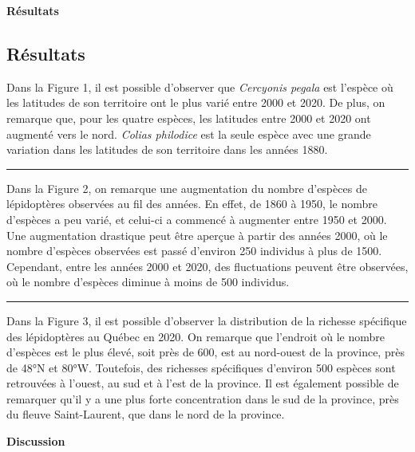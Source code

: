 \documentclass[9pt,twocolumn,twoside,]{pnas-new}
\begin{document}
\textbf{Résultats}

\subsection{Résultats}\label{ruxe9sultats}

Dans la Figure 1, il est possible d'observer que \emph{Cercyonis pegala}
est l'espèce où les latitudes de son territoire ont le plus varié entre
2000 et 2020. De plus, on remarque que, pour les quatre espèces, les
latitudes entre 2000 et 2020 ont augmenté vers le nord. \emph{Colias
philodice} est la seule espèce avec une grande variation dans les
latitudes de son territoire dans les années 1880.

\begin{center}\rule{0.5\linewidth}{0.5pt}\end{center}

Dans la Figure 2, on remarque une augmentation du nombre d'espèces de
lépidoptères observées au fil des années. En effet, de 1860 à 1950, le
nombre d'espèces a peu varié, et celui-ci a commencé à augmenter entre
1950 et 2000. Une augmentation drastique peut être aperçue à partir des
années 2000, où le nombre d'espèces observées est passé d'environ 250
individus à plus de 1500. Cependant, entre les années 2000 et 2020, des
fluctuations peuvent être observées, où le nombre d'espèces diminue à
moins de 500 individus.

\begin{center}\rule{0.5\linewidth}{0.5pt}\end{center}

Dans la Figure 3, il est possible d'observer la distribution de la
richesse spécifique des lépidoptères au Québec en 2020. On remarque que
l'endroit où le nombre d'espèces est le plus élevé, soit près de 600,
est au nord-ouest de la province, près de 48°N et 80°W. Toutefois, des
richesses spécifiques d'environ 500 espèces sont retrouvées à l'ouest,
au sud et à l'est de la province. Il est également possible de remarquer
qu'il y a une plus forte concentration dans le sud de la province, près
du fleuve Saint-Laurent, que dans le nord de la province.

\textbf{Discussion }
\end{document}

